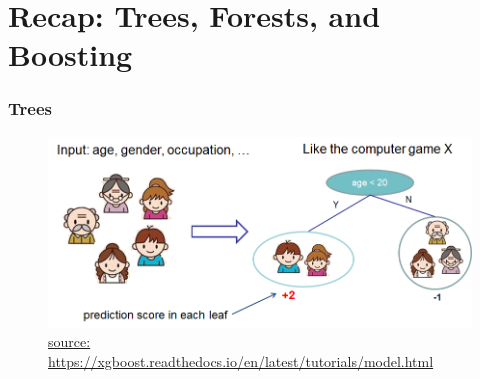 \documentclass[
  shownotes,
  xcolor={svgnames},
  hyperref={colorlinks,citecolor=DarkBlue,linkcolor=DarkRed,urlcolor=DarkBlue}
  , aspectratio=169]{beamer}
\begin{document}
\section{Recap: Trees, Forests, and Boosting}
\begin{frame}[fragile]
\frametitle{ Trees }

\begin{figure}[H] \centering
            \captionsetup{justification=centering}
              \includegraphics[scale=0.5]{figures/cart}
              \\
              \tiny
              \url{source: https://xgboost.readthedocs.io/en/latest/tutorials/model.html}
 \end{figure}



\end{frame}
\end{document}

